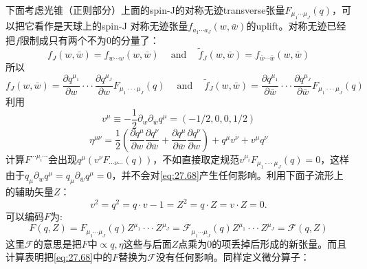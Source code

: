 下面考虑光锥（正则部分）上面的spin\mbox{-}J的对称无迹transverse张量$F_{\mu_{1}\cdots\mu_{J}}(q)$，可以把它看作是天球上的spin\mbox{-}J 对称无迹张量$f_{a_{1}\cdots a_{J}}(w,\bar{w})$的uplift。对称无迹已经把$f$限制成只有两个不为$0$的分量了：
\begin{equation}
	f_J(w,\bar{w})=f_{w\cdots w}(w,\bar{w})\quad\mathrm{~and~}\quad\tilde{f}_J(w,\bar{w})=f_{\bar{w}\cdots\bar{w}}(w,\bar{w})
\end{equation} 
所以
\begin{equation}\label{eq:27.68}
	f_J(w,\bar{w})=\frac{\partial q^{\mu_1}}{\partial w}\cdotp\cdotp\cdotp\frac{\partial q^{\mu_J}}{\partial w}F_{\mu_1\cdotp\cdotp\cdotp\mu_J}(q)\quad\mathrm{~and~}\quad\tilde{f}_J(w,\bar{w})=\frac{\partial q^{\mu_1}}{\partial\bar{w}}\cdotp\cdotp\cdotp\frac{\partial q^{\mu_J}}{\partial\bar{w}}F_{\mu_1\cdotp\cdotp\cdotp\mu_J}(q)
\end{equation}
利用
\begin{equation}
	v^{\mu}\equiv-\frac{1}{2}\partial_{w}\partial_{\bar{w}}q^{\mu}=(-1/2,0,0,1/2)
\end{equation}
\begin{equation}
	\eta^{\mu\nu}=\frac{1}{2}\left(\frac{\partial q^{\mu}}{\partial w}\frac{\partial q^{\nu}}{\partial\bar{w}}+\frac{\partial q^{\mu}}{\partial\bar{w}}\frac{\partial q^{\nu}}{\partial w}\right)+q^{\mu}v^{\nu}+v^{\mu}q^{\nu}
\end{equation}
计算$F^{\cdots\mu_i \cdots}$会出现$q^{\mu}\left(v^{\nu}F_{\cdots\nu\cdots}(q)\right)$，不如直接取定规范$v^{\mu_i}F_{\mu_1\cdot\cdot\cdot\mu_J}(q)=0$，这样由于$q_{\mu}\partial_{w}q^{\mu}=q_{\mu}\partial_{\bar{w}}q^{\mu}=0$，并不会对\ref{eq:27.68}产生任何影响。利用下面子流形上的辅助矢量$Z$：
\begin{equation}
	v^2=q^2=q\cdot v-1=Z^2=q\cdot Z=v\cdot Z=0.
\end{equation}
可以编码$F$为:
\begin{equation}
	F(q,Z)=F_{\mu_{1}\cdots\mu_{J}}(q)Z^{\mu_{1}}\cdotp\cdotp\cdotp Z^{\mu_{J}}=\mathcal{F}_{\mu_{1}\cdots\mu_{J}}(q)Z^{\mu_{1}}\cdotp\cdotp\cdotp Z^{\mu_{J}}=\mathcal{F}(q,Z)
\end{equation}
这里$\mathcal{F}$的意思是把$F$中$\propto q,\eta$这些与后面$Z$点乘为$0$的项丢掉后形成的新张量。而且计算表明把\ref{eq:27.68}中的$F$替换为$\mathcal{F}$没有任何影响。同样定义微分算子：
